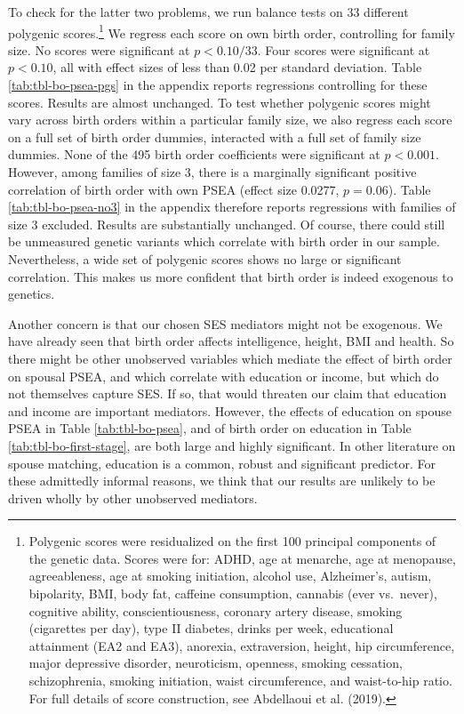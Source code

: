 \documentclass[
]{article}
\theoremstyle{definition}
\theoremstyle{definition}
\theoremstyle{definition}
\theoremstyle{definition}
\theoremstyle{remark}
\begin{document}
To check for the latter two problems, we run balance tests on 33 different
polygenic scores.\footnote{Polygenic scores were residualized on the first 100 principal
  components of the genetic data. Scores were for: ADHD, age at
  menarche, age at menopause, agreeableness, age at smoking
  initiation, alcohol use, Alzheimer's, autism, bipolarity, BMI, body
  fat, caffeine consumption, cannabis (ever vs.~never), cognitive
  ability, conscientiousness, coronary artery disease, smoking
  (cigarettes per day), type II diabetes, drinks per week, educational
  attainment (EA2 and EA3), anorexia, extraversion, height, hip
  circumference, major depressive disorder, neuroticism, openness,
  smoking cessation, schizophrenia, smoking initiation, waist
  circumference, and waist-to-hip ratio. For full details of score
  construction, see Abdellaoui et al. (2019).} We regress each score on own birth order, controlling for
family size. No scores were significant at \(p < 0.10/33\). Four scores were
significant at \(p < 0.10\), all with effect sizes of less than 0.02 per standard
deviation. Table \ref{tab:tbl-bo-psea-pgs} in the appendix reports
regressions controlling for these scores. Results are almost unchanged. To test
whether polygenic scores might vary across birth orders within a particular
family size, we also regress each score on a full set of birth order dummies,
interacted with a full set of family size dummies. None of the
495 birth order coefficients were significant at \(p < 0.001\).
However, among families of size 3, there is a marginally significant positive
correlation of birth order with own PSEA (effect size
0.0277, \(p = 0.06\)). Table
\ref{tab:tbl-bo-psea-no3} in the appendix therefore reports regressions with
families of size 3 excluded. Results are substantially unchanged. Of course,
there could still be unmeasured genetic variants which correlate with birth
order in our sample. Nevertheless, a wide set of polygenic scores shows no large
or significant correlation. This makes us more confident that birth order is
indeed exogenous to genetics.

Another concern is that our chosen SES mediators might not be exogenous. We have
already seen that birth order affects intelligence, height, BMI
and health. So there might be other unobserved variables which mediate the effect
of birth order on spousal PSEA, and which correlate with education or income,
but which do not themselves capture SES. If so, that would threaten our claim that
education and income are important mediators. However, the effects of education
on spouse PSEA in Table \ref{tab:tbl-bo-psea}, and of birth order on education in
Table \ref{tab:tbl-bo-first-stage}, are both large and highly significant. In other
literature on spouse matching, education is a common, robust and significant
predictor. For these admittedly informal reasons, we think that our results
are unlikely to be driven wholly by other unobserved mediators.
\end{document}
